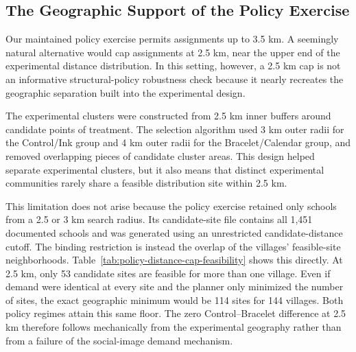 \documentclass[12pt]{article}
\begin{document}
\providecommand{\StructuralRobustnessPath}{appendix/structural-robustness}

\subsection{The Geographic Support of the Policy Exercise}
\label{app:policy-distance-cap}

Our maintained policy exercise permits assignments up to 3.5 km. A seemingly
natural alternative would cap assignments at 2.5 km, near the upper end of the
experimental distance distribution. In this setting, however, a 2.5 km cap is
not an informative structural-policy robustness check because it nearly
recreates the geographic separation built into the experimental design.

The experimental clusters were constructed from 2.5 km inner buffers around
candidate points of treatment. The selection algorithm used 3 km outer radii
for the Control/Ink group and 4 km outer radii for the Bracelet/Calendar group,
and removed overlapping pieces of candidate cluster areas. This design helped
separate experimental clusters, but it also means that distinct experimental
communities rarely share a feasible distribution site within 2.5 km.

This limitation does not arise because the policy exercise retained only
schools from a 2.5 or 3 km search radius. Its candidate-site file contains all
1,451 documented schools and was generated using an unrestricted
candidate-distance cutoff. The binding restriction is instead the overlap of the villages'
feasible-site neighborhoods. Table~\ref{tab:policy-distance-cap-feasibility}
shows this directly. At 2.5 km, only 53 candidate sites are feasible for more
than one village. Even if demand were identical at every site and the planner
only minimized the number of sites, the exact geographic minimum would be 114
sites for 144 villages. Both policy regimes attain this same floor. The zero
Control--Bracelet difference at 2.5 km therefore follows mechanically from the
experimental geography rather than from a failure of the social-image demand
mechanism.
\end{document}
